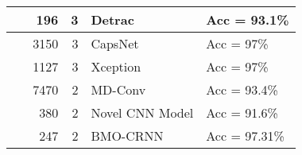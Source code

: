 \begin{table}[htbp]
\begin{center}
\begin{adjustbox}{angle=90}
\begin{tabular}{|l|r|r|l|l|}
\hline
~\cite{51abbas2021classification} &  196 &    3 &    Detrac &    Acc = 93.1\% \\
\hline
~\cite{52toraman2020convolutional} & 3150 &    3 &  CapsNet &  Acc = 97\% \\
\hline
~\cite{53das2022automated} & 1127 &    3 &  Xception &  Acc = 97\% \\
\hline
~\cite{54hu2020learning} & 7470 &    2 &   MD-Conv &    Acc = 93.4\% \\
\hline
~\cite{55ismael2021deep} &  380 &    2 &  Novel CNN Model &    Acc = 91.6\% \\
\hline
~\cite{56shankar2021optimal} &  247 &    2 &  BMO-CRNN &  Acc = 97.31\% \\
\hline
\end{tabular}
\end{adjustbox}
\end{center}
\end{table}
